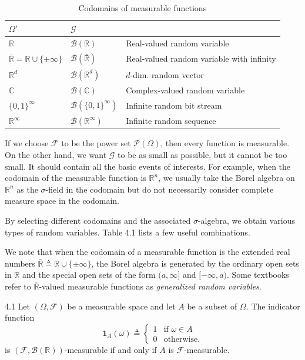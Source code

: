 \begin{table}[h]
\centering
\caption{Codomains of measurable functions}
\label{tab:codomains}
\begin{tabular}{|l|l|l|}
\hline
$\Omega'$ & $\mathcal{G}$ & \\
\hline
$\mathbb{R}$ & $\mathcal{B}(\mathbb{R})$ & Real-valued random variable \\
$\bar{\mathbb{R}} = \mathbb{R} \cup \{\pm\infty\}$ & $\mathcal{B}(\bar{\mathbb{R}})$ & Real-valued random variable with infinity \\
$\mathbb{R}^d$ & $\mathcal{B}(\mathbb{R}^d)$ & $d$-dim. random vector \\
$\mathbb{C}$ & $\mathcal{B}(\mathbb{C})$ & Complex-valued random variable \\
$\{0, 1\}^\infty$ & $\mathcal{B}(\{0, 1\}^\infty)$ & Infinite random bit stream \\
$\mathbb{R}^\infty$ & $\mathcal{B}(\mathbb{R}^\infty)$ & Infinite random sequence \\
\hline
\end{tabular}
\end{table}

If we choose $\mathcal{F}$ to be the power set $\mathcal{P}(\Omega)$, then every function is measurable. On the other hand, we want $\mathcal{G}$ to be as small as possible, but it cannot be too small. It should contain all the basic events of interests. For example, when the codomain of the measurable function is $\mathbb{R}^n$, we usually take the Borel algebra on $\mathbb{R}^n$ as the $\sigma$-field in the codomain but do not necessarily consider complete measure space in the codomain.

By selecting different codomains and the associated $\sigma$-algebra, we obtain various types of random variables. Table 4.1 lists a few useful combinations.

We note that when the codomain of a measurable function is the extended real numbers $\bar{\mathbb{R}} \triangleq \mathbb{R} \cup \{\pm\infty\}$, the Borel algebra is generated by the ordinary open sets in $\mathbb{R}$ and the special open sets of the form $(a, \infty]$ and $[-\infty, a)$. Some textbooks refer to $\bar{\mathbb{R}}$-valued measurable functions as \textit{generalized random variables}.

\begin{thmbox}{4.1}
Let $(\Omega, \mathcal{F})$ be a measurable space and let $A$ be a subset of $\Omega$. The indicator function
\[
\mathbf{1}_A(\omega) \triangleq \begin{cases} 1 & \text{if } \omega \in A \\ 0 & \text{otherwise.} \end{cases}
\]
is $(\mathcal{F}, \mathcal{B}(\mathbb{R}))$-measurable if and only if $A$ is $\mathcal{F}$-measurable.
\end{thmbox}

